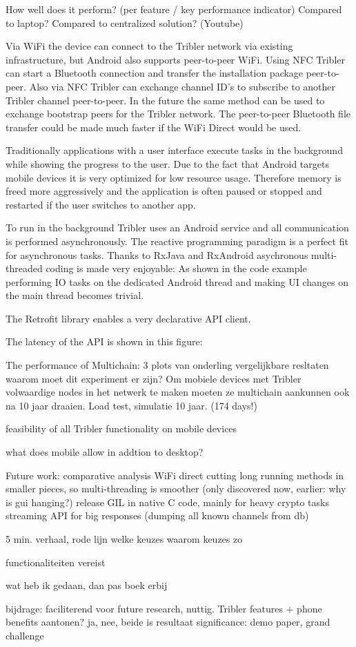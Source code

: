 How well does it perform? (per feature / key performance indicator)
Compared to laptop?
Compared to centralized solution? (Youtube)




Via WiFi the device can connect to the Tribler network via existing infrastructure, but Android also supports peer-to-peer WiFi.
Using NFC Tribler can start a Bluetooth connection and transfer the installation package peer-to-peer.
Also via NFC Tribler can exchange channel ID's to subscribe to another Tribler channel peer-to-peer.
In the future the same method can be used to exchange bootstrap peers for the Tribler network.
The peer-to-peer Bluetooth file transfer could be made much faster if the WiFi Direct would be used.


Traditionally applications with a user interface execute tasks in the background while showing the progress to the user.
Due to the fact that Android targets mobile devices it is very optimized for low resource usage.
Therefore memory is freed more aggressively and the application is often paused or stopped and restarted if the user switches to another app.

To run in the background Tribler uses an Android service and all communication is performed asynchronously.
The reactive programming paradigm is a perfect fit for asynchronous tasks.
Thanks to RxJava and RxAndroid asychronous multi-threaded coding is made very enjoyable:
As shown in the code example performing IO tasks on the dedicated Android thread and making UI changes on the main thread becomes trivial.

The Retrofit library enables a very declarative API client.


The latency of the API is shown in this figure:

The performance of Multichain:
3 plots van onderling vergelijkbare resltaten
waarom moet dit experiment er zijn?
Om mobiele devices met Tribler volwaardige nodes in het netwerk te maken moeten ze multichain aankunnen ook na 10 jaar draaien.
Load test, simulatie 10 jaar. (174 days!)

feasibility of all Tribler functionality on mobile devices

what does mobile allow in addtion to desktop?





Future work:
comparative analysis
WiFi direct
cutting long running methods in smaller pieces, so multi-threading is smoother (only discovered now, earlier: why is gui hanging?)
release GIL in native C code, mainly for heavy crypto tasks
streaming API for big responses (dumping all known channels from db)



5 min. verhaal, rode lijn
welke keuzes
waarom keuzes zo

functionaliteiten vereist


wat heb ik gedaan, dan pas boek erbij


bijdrage: faciliterend voor future research, nuttig. Tribler features + phone benefits
aantonen? ja, nee, beide is resultaat
significance: demo paper, grand challenge

